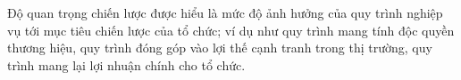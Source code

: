 Độ quan trọng chiến lược được hiểu là mức độ ảnh hưởng của quy trình nghiệp vụ tới mục tiêu chiến lược của tổ chức; ví dụ như quy trình mang tính độc quyền thương hiệu, quy trình đóng góp vào lợi thế cạnh tranh trong thị trường, quy trình mang lại lợi nhuận chính cho tổ chức.